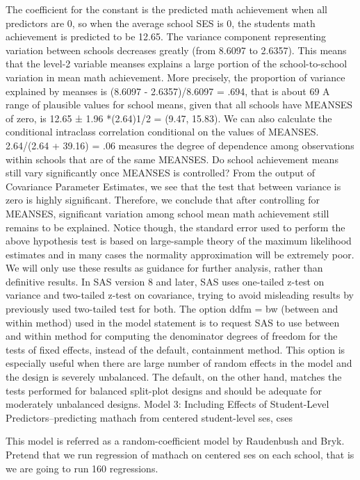 The coefficient for the constant is the predicted math achievement when all predictors are 0, so when the average school SES is 0, the students math achievement is predicted to be 12.65. 
The variance component representing variation between schools decreases greatly (from  8.6097 to 2.6357). This means that the level-2 variable meanses explains a large portion of the school-to-school variation in mean math achievement. More precisely, the proportion of variance explained by meanses is (8.6097 - 2.6357)/8.6097 = .694, that is about 69%
A range of plausible values for school means, given that all schools have MEANSES of zero, is 12.65 ± 1.96 *(2.64)1/2 = (9.47, 15.83).
We can also calculate the conditional intraclass correlation conditional on the values of MEANSES. 2.64/(2.64 + 39.16) = .06 measures the degree of dependence among observations within schools that are of the same MEANSES.
Do school achievement means still vary significantly once MEANSES is controlled? From the output of Covariance Parameter Estimates, we see that the test that between variance is zero is highly significant. Therefore, we conclude that after controlling for MEANSES, significant variation among school mean math achievement still remains to be explained.
Notice though, the standard error used to perform the above hypothesis test is based on large-sample theory of the maximum likelihood estimates and in many cases the normality approximation will be extremely poor. We will only use these results as guidance for further analysis, rather than definitive results. In SAS version 8 and later, SAS uses one-tailed z-test on variance and two-tailed z-test on covariance, trying to avoid misleading results by previously used two-tailed test for both.
The option ddfm = bw (between and within method) used in the model statement is to request SAS to use between and within method for computing the denominator degrees of freedom for the tests of fixed effects, instead of the default, containment method. This option is especially useful when there are large number of random effects in the model and the design is severely unbalanced. The default, on the other hand, matches the tests performed for balanced split-plot designs and should be adequate for moderately unbalanced designs.
Model 3: Including Effects of Student-Level Predictors--predicting mathach from centered student-level ses, cses

This model is referred as a random-coefficient model by Raudenbush and Bryk. Pretend that we run regression of mathach on centered ses on each school, that is we are going to run 160 regressions.

